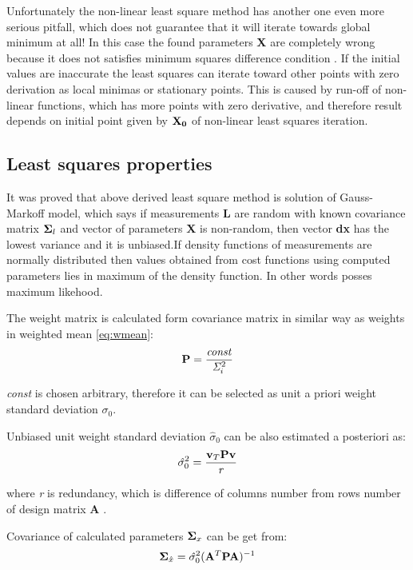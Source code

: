 \documentclass[a4paper,12pt]{report}
\newcommand{\ematr}[1]{
{\bf #1}
}
\newcommand{\evect}[1]{
{\bf #1}
}
\newcommand{\escal}[1]{
{\it #1}
}
\begin{document}
Unfortunately the non-linear least square method has another one even more serious pitfall, which 
does not guarantee that it will iterate towards global minimum at all!
In this case the found parameters \evect{X} are completely wrong because 
it does not satisfies minimum squares difference condition \label{eq:min_cond}. If the initial values are 
inaccurate the least squares can iterate toward other points with zero derivation as local minimas or stationary points.  
This is caused by run-off of non-linear functions, which has more points with zero derivative,
and therefore result depends on initial point given by $\evect{X_{0}}$  of non-linear least squares iteration.


\subsection{Least squares properties}

It was proved that above derived least square method is solution of Gauss-Markoff model, which 
says if measurements \evect{L} are random with known covariance matrix $\ematr{\Sigma}_{l}$  and vector of parameters \evect{X} is non-random, then
vector \evect{dx}  has the lowest variance and it is unbiased.If density functions of measurements are normally 
distributed then values obtained from cost functions using  computed parameters lies in maximum of the density
function. In other words posses maximum likehood.

The weight matrix is calculated form covariance matrix in similar way as weights in weighted mean \eqref{eq:wmean}:
\begin{equation}
\ematr{P} = \frac{\escal{const}}{\escal{\Sigma}_{i}^{2}}
\end{equation} 

\escal{const} is chosen arbitrary, therefore it can be selected as unit a priori weight standard deviation $\sigma_{0}$. 


Unbiased unit weight standard deviation $\hat{\sigma}_{0}$ can be also estimated a posteriori as:
\begin{equation}
\escal{\hat{\sigma}}_{0}^{2} = \frac{\evect{v}_{T} \ematr{P}  \evect{v}}{\escal{r}}
\end{equation} 

where \escal{r} is redundancy, which is difference of columns number from rows number of design matrix \ematr{A}.

Covariance of calculated parameters $\ematr{\Sigma}_{x}$ can be get from:
\begin{equation}
\ematr{\Sigma}_{\hat{x}} = \escal{\hat{\sigma}}_{0}^{2} (\ematr{A}^{T} \ematr{P} \ematr{A})^{-1}
\end{equation} 
\end{document}
